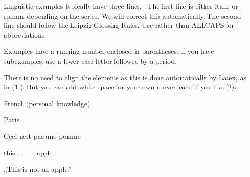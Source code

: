 \begin{styleStandard}
Linguistic examples typically have three lines. \ The first line is either italic or roman, depending on the series. We will correct this automatically. The second line should follow the Leipzig Glossing Rules. Use  rather than ALLCAPS for abbreviations.
\end{styleStandard}

\begin{styleStandard}
Examples have a running number enclosed in parentheses. If you have subexamples, use a lower case letter followed by a period.
\end{styleStandard}

\begin{styleStandard}
There is no need to align the elements as this is done automatically by Latex, as in (1.). But you can add white space for your own convenience if you like (2).
\end{styleStandard}

\setcounter{listLangSciLanginfoiileveli}{0}
\begin{listLangSciLanginfoiileveli}
\item 
\begin{styleLangSciLanginfo}
French (personal knowledge)
\end{styleLangSciLanginfo}

\setcounter{listLangSciLanginfoiilevelii}{0}
\begin{listLangSciLanginfoiilevelii}
\item 
\begin{styleLangSciLanginfo}
Paris
\end{styleLangSciLanginfo}
\end{listLangSciLanginfoiilevelii}
\end{listLangSciLanginfoiileveli}
\begin{styleLangSciExample}
Ceci n{\textquotesingle}est pas une pomme
\end{styleLangSciExample}

\begin{styleLangSciIMT}
this  .. \  \ . apple
\end{styleLangSciIMT}

\begin{styleLangSciTranslationSubexample}
„This is not an apple.”
\end{styleLangSciTranslationSubexample}

